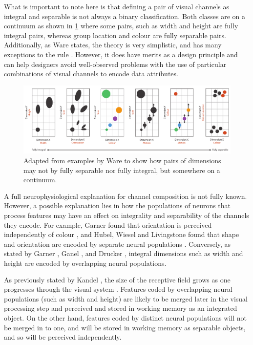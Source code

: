 What is important to note here is that defining a pair of visual channels as integral and separable is not always a binary classification. 
Both classes are on a continuum as shown in \ref{fig:integral_separable_continuum} where some pairs, such as width and height are fully integral pairs, whereas group location and colour are fully separable pairs. 
Additionally, as Ware states, the theory is very simplistic, and has many exceptions to the rule \cite{ware13}.
However, it does have merits as a design principle and can help designers avoid well-observed problems with the use of particular combinations of visual channels to encode data attributes.

 \begin{figure}[t!]
\includegraphics[width=\textwidth]{images/related-work/integral_separable_continuum}
\caption{Adapted from examples by Ware \cite{ware13} to show how pairs of dimensions may not by fully separable nor fully integral, but somewhere on a continuum.}
\label{fig:integral_separable_continuum}
\end{figure}

A full neurophysiological explanation for channel composition is not fully known.
However, a possible explanation lies in how the populations of neurons that process features may have an effect on integrality and separability of the channels they encode.
For example, Garner found that orientation is perceived independently of colour \cite{garner2014}, and Hubel, Wiesel and Livingstone found that shape and orientation are encoded by separate neural populations \cite{hubel1968, livingstone1988}.
Conversely, as stated by Garner \cite{garner2014}, Ganel \etal \cite{ganel2006}, and Drucker \etal \cite{drucker2009}, integral dimensions such as width and height are encoded by overlapping neural populations.

As previously stated by Kandel \etal, the size of the receptive field grows as one progresses through the visual system \cite{kandel2012principles}.
Features coded by overlapping neural populations (such as width and height) are likely to be merged later in the visual processing step and perceived and stored in working memory as an integrated object.
On the other hand, features coded by distinct neural populations will not be merged in to one, and will be stored in working memory as separable objects, and so will be perceived independently.

